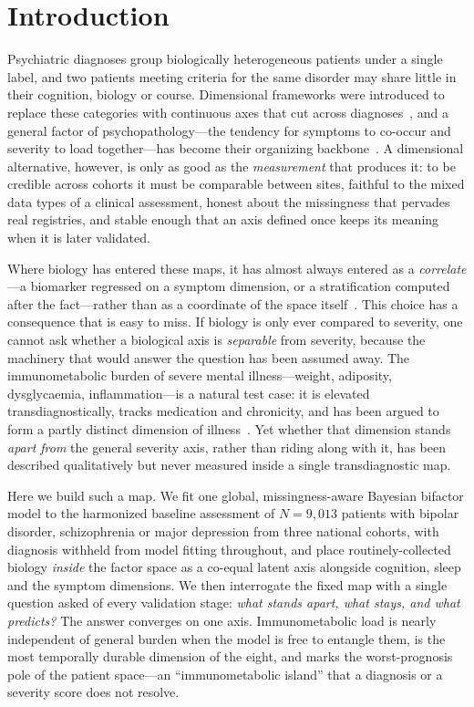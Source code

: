 \section{Introduction}

Psychiatric diagnoses group biologically heterogeneous patients under a single label, and two
patients meeting criteria for the same disorder may share little in their cognition, biology or
course. Dimensional frameworks were introduced to replace these categories with continuous axes
that cut across diagnoses~\citep{insel2010rdoc,kotov2017hitop,ruggero2019hitop}, and a general
factor of psychopathology---the tendency for symptoms to co-occur and severity to load
together---has become their organizing backbone~\citep{caspi2014pfactor,lahey2017general}. A
dimensional alternative, however, is only as good as the \emph{measurement} that produces it: to
be credible across cohorts it must be comparable between sites, faithful to the mixed data types
of a clinical assessment, honest about the missingness that pervades real registries, and stable
enough that an axis defined once keeps its meaning when it is later validated.

Where biology has entered these maps, it has almost always entered as a \emph{correlate}---a
biomarker regressed on a symptom dimension, or a stratification computed after the fact---rather
than as a coordinate of the space itself~\citep{marquand2016,wolfers2018,segal2023}. This choice
has a consequence that is easy to miss. If biology is only ever compared to severity, one cannot
ask whether a biological axis is \emph{separable} from severity, because the machinery that would
answer the question has been assumed away. The immunometabolic burden of severe mental
illness---weight, adiposity, dysglycaemia, inflammation---is a natural test case: it is elevated
transdiagnostically, tracks medication and chronicity, and has been argued to form a partly
distinct dimension of illness~\citep{vancampfort2015mets,pillinger2017,perry2019,penninx2024imd,milaneschi2020,lamers2020}.
Yet whether that dimension stands \emph{apart from} the general severity axis, rather than
riding along with it, has been described qualitatively but never measured inside a single
transdiagnostic map.

Here we build such a map. We fit one global, missingness-aware Bayesian bifactor model to the
harmonized baseline assessment of $N=9{,}013$ patients with bipolar disorder, schizophrenia or
major depression from three national cohorts, with diagnosis withheld from model fitting
throughout, and place routinely-collected biology \emph{inside} the factor space as a co-equal
latent axis alongside cognition, sleep and the symptom dimensions. We then interrogate the fixed
map with a single question asked of every validation stage: \emph{what stands apart, what stays,
and what predicts?} The answer converges on one axis. Immunometabolic load is nearly independent
of general burden when the model is free to entangle them, is the most temporally durable
dimension of the eight, and marks the worst-prognosis pole of the patient space---an
``immunometabolic island'' that a diagnosis or a severity score does not resolve.

